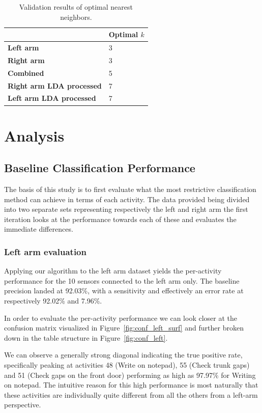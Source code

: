 \documentclass{sig-alternate}
\begin{document}
\begin{table}[t]
\centering
\caption{Validation results of optimal nearest neighbors.}
\begin{tabular}{|l|l|}
\hline
           			&\textbf{Optimal $k$} 	\\ \hline
\textbf{Left arm}  						& 3 		 				\\ \hline
\textbf{Right arm} 						& 3		 					\\ \hline
\textbf{Combined}  						& 5 						\\ \hline
\textbf{Right arm LDA processed} 		& 7 						\\ \hline
\textbf{Left arm LDA processed} 		& 7 						\\ \hline

\end{tabular}
\label{tab:optimal_k}
\end{table}


\section{Analysis}
\subsection{Baseline Classification Performance}
The basis of this study is to first evaluate what the most restrictive classification method can achieve in terms of each activity. The data provided being divided into two separate sets representing respectively the left and right arm the first iteration looks at the performance towards each of these and evaluates the immediate differences.

\subsubsection{Left arm evaluation}
Applying our algorithm to the left arm dataset yields the per-activity performance for the 10 sensors connected to the left arm only. The baseline precision landed at 92.03\%, with a sensitivity and effectively an error rate at respectively 92.02\% and 7.96\%. 

In order to evaluate the per-activity performance we can look closer at the confusion matrix visualized in Figure~\ref{fig:conf_left_surf} and further broken down in the table structure in Figure~\ref{fig:conf_left}.

We can observe a generally strong diagonal indicating the true positive rate, specifically peaking at activities 48 (Write on notepad), 55 (Check trunk gaps)  and 51 (Check gaps on the front door) performing as high as 97.97\% for Writing on notepad. The intuitive reason for this high performance is most naturally that these activities are individually quite different from all the others from a left-arm perspective. 
\end{document}
